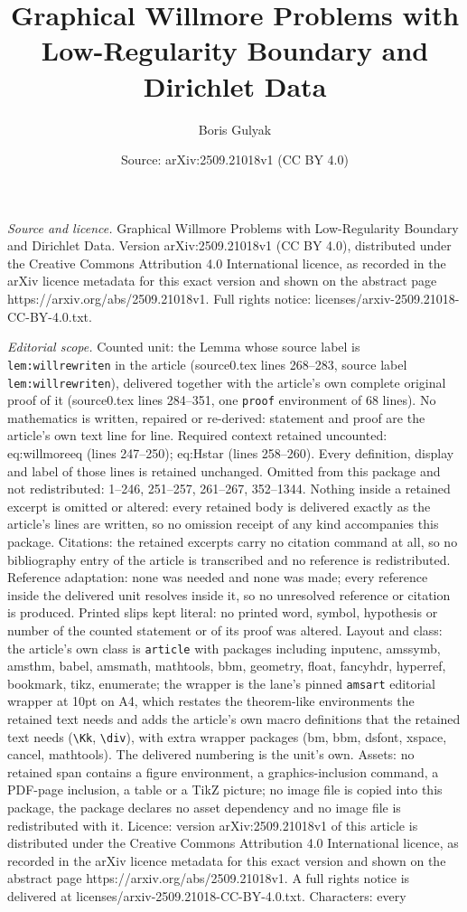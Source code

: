\documentclass[10pt,a4paper]{amsart}
\title[Graphical Willmore Problems with Low-Regularity Boundary and]{Graphical Willmore Problems with Low-Regularity Boundary and Dirichlet Data}
\author{Boris Gulyak}
\date{Source: arXiv:2509.21018v1 (CC BY 4.0)}
\begin{document}
\maketitle

\noindent\emph{Source and licence.} Graphical Willmore Problems with Low-Regularity Boundary and Dirichlet Data. Version arXiv:2509.21018v1 (CC BY 4.0), distributed under the Creative Commons Attribution 4.0 International licence, as recorded in the arXiv licence metadata for this exact version and shown on the abstract page https://arxiv.org/abs/2509.21018v1. Full rights notice: licenses/arxiv-2509.21018-CC-BY-4.0.txt.\par\smallskip

\noindent\textit{Editorial scope.} Counted unit: the Lemma whose source label is \texttt{lem:willrewriten} in the article (source0.tex lines 268--283, source label \texttt{lem:willrewriten}), delivered together with the article's own complete original proof of it (source0.tex lines 284--351, one \texttt{proof} environment of 68 lines). No mathematics is written, repaired or re-derived: statement and proof are the article's own text line for line. Required context retained uncounted: eq:willmoreeq (lines 247--250); eq:Hstar (lines 258--260). Every definition, display and label of those lines is retained unchanged. Omitted from this package and not redistributed: 1--246, 251--257, 261--267, 352--1344. Nothing inside a retained excerpt is omitted or altered: every retained body is delivered exactly as the article's lines are written, so no omission receipt of any kind accompanies this package. Citations: the retained excerpts carry no citation command at all, so no bibliography entry of the article is transcribed and no reference is redistributed. Reference adaptation: none was needed and none was made; every reference inside the delivered unit resolves inside it, so no unresolved reference or citation is produced. Printed slips kept literal: no printed word, symbol, hypothesis or number of the counted statement or of its proof was altered. Layout and class: the article's own class is \texttt{article} with packages including inputenc, amssymb, amsthm, babel, amsmath, mathtools, bbm, geometry, float, fancyhdr, hyperref, bookmark, tikz, enumerate; the wrapper is the lane's pinned \texttt{amsart} editorial wrapper at 10pt on A4, which restates the theorem-like environments the retained text needs and adds the article's own macro definitions that the retained text needs (\texttt{\textbackslash Kk}, \texttt{\textbackslash div}), with extra wrapper packages (bm, bbm, dsfont, xspace, cancel, mathtools). The delivered numbering is the unit's own. Assets: no retained span contains a figure environment, a graphics-inclusion command, a PDF-page inclusion, a table or a TikZ picture; no image file is copied into this package, the package declares no asset dependency and no image file is redistributed with it. Licence: version arXiv:2509.21018v1 of this article is distributed under the Creative Commons Attribution 4.0 International licence, as recorded in the arXiv licence metadata for this exact version and shown on the abstract page https://arxiv.org/abs/2509.21018v1. A full rights notice is delivered at licenses/arxiv-2509.21018-CC-BY-4.0.txt. Characters: every 
\end{document}
